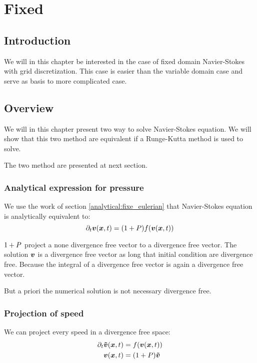 \chapter{Fixed}
\minitoc
\section{Introduction}

We will in this chapter be interested in the case of fixed domain Navier-Stokes with grid discretization.
This case is easier than the variable domain case and serve as basis to more complicated case.

\section{Overview}

We will in this chapter present two way to solve Navier-Stokes equation.
We will show that this two method are equivalent if a Runge-Kutta method is used to solve.

The two method are presented at next section.
\subsection{Analytical expression for pressure}
\label{fixed:analytical}

We use the work of section \ref{analytical:fixe_eulerian} that Navier-Stokes equation is analytically equivalent to:
\begin{equation}
  \partial_t {\boldsymbol {v}}({\boldsymbol {x}} ,t)=(1+P)f({\boldsymbol {v}}({\boldsymbol {x}},t))
\end{equation}

$1+P$ project a none divergence free vector to a divergence free vector.
The solution ${\boldsymbol {v}}$ is a divergence free vector as long that initial condition are divergence free. Because the integral of a divergence free vector is again a divergence free vector.

But a priori the numerical solution is not necessary divergence free.

\subsection{Projection of speed}
\label{fixed:proj}

We can project every speed in a divergence free space:
\begin{subequations}
\begin{align}
  \partial_t {\boldsymbol {\tilde{v}}}({\boldsymbol {x}} ,t)&=f({\boldsymbol {v}}({\boldsymbol {x}},t))\\
  {\boldsymbol {v}}({\boldsymbol {x}},t)&=(1+P){\boldsymbol {\tilde{v}}}
\end{align}
\end{subequations}

